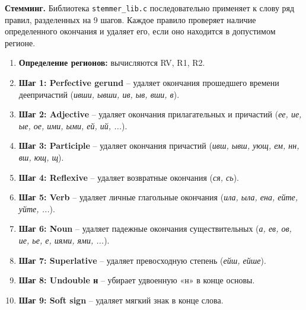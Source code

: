 \vspace{1 em}
\noindent\textbf{Стемминг.} Библиотека \texttt{stemmer\_lib.c} последовательно применяет к слову ряд правил, разделенных на 9 шагов. Каждое правило проверяет наличие определенного окончания и удаляет его, если оно находится в допустимом регионе.

\begin{enumerate}
    \item \textbf{Определение регионов:} вычисляются RV, R1, R2.
    \item \textbf{Шаг 1: Perfective gerund} -- удаляет окончания прошедшего времени деепричастий (\textit{ивши, ывши, ив, ыв, вши, в}).
    \item \textbf{Шаг 2: Adjective} -- удаляет окончания прилагательных и причастий (\textit{ее, ие, ые, ое, ими, ыми, ей, ий, ...}).
    \item \textbf{Шаг 3: Participle} -- удаляет окончания причастий (\textit{ивш, ывш, ующ, ем, нн, вш, ющ, щ}).
    \item \textbf{Шаг 4: Reflexive} -- удаляет возвратные окончания (\textit{ся, сь}).
    \item \textbf{Шаг 5: Verb} -- удаляет личные глагольные окончания (\textit{ила, ыла, ена, ейте, уйте, ...}).
    \item \textbf{Шаг 6: Noun} -- удаляет падежные окончания существительных (\textit{а, ев, ов, ие, ье, е, иями, ями, ...}).
    \item \textbf{Шаг 7: Superlative} -- удаляет превосходную степень (\textit{ейш, ейше}).
    \item \textbf{Шаг 8: Undouble н} -- убирает удвоенную «н» в конце основы.
    \item \textbf{Шаг 9: Soft sign} -- удаляет мягкий знак в конце слова.
\end{enumerate}

